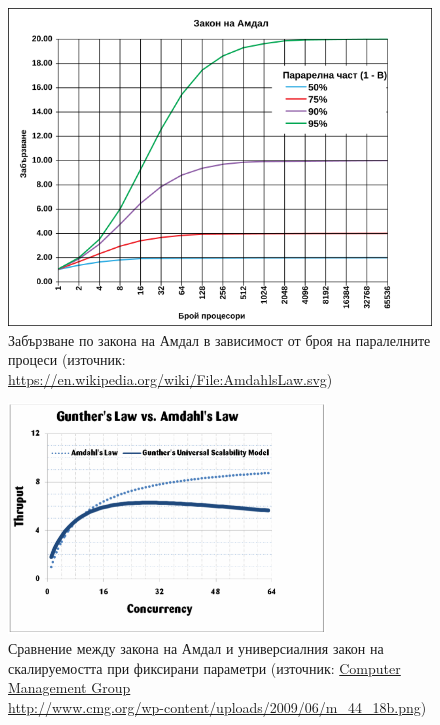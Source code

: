 \begin{figure}
  \includegraphics[width=\textwidth]{images/amdahls-law.png}
  \caption[Забързване по закона на Амдал в зависимост от броя на паралелните процеси]{Забързване по закона на Амдал в зависимост от броя на паралелните процеси (източник: \footnotesize\url{https://en.wikipedia.org/wiki/File:AmdahlsLaw.svg})}
  \label{fig:amdahls-law}
\end{figure}

\begin{figure}
  \centering\includegraphics[width=0.75\textwidth]{images/gunthers-amdahls-laws.png}
  \caption[Сравнение между закона на Амдал и и универсиалния закон на скалируемостта при фиксирани параметри]{Сравнение между закона на Амдал и универсиалния закон на скалируемостта при фиксирани параметри (източник: \href{http://www.cmg.org/publications/measureit/2007-2/mit44/measureit-issue-5-09-a-review-of-beginning-excel-what-if-data-analysis-tools-getting-started-with-goal-seek-data-tables-scenarios-and-solver-by-michael-s-hines/}{Computer Management Group\\
      http://www.cmg.org/wp-content/uploads/2009/06/m\_44\_18b.png})}
  \label{fig:gunthers-law}
\end{figure}

